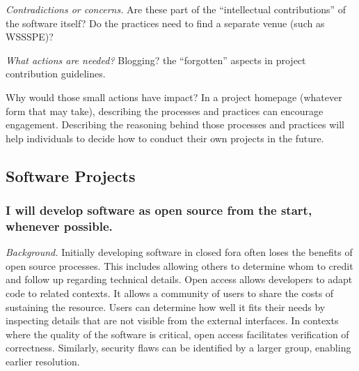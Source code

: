 \documentclass[a4paper,UKenglish]{dagman}
\renewcommand{\paragraph}[1]{\subsubsection*{#1}\xspace}
\begin{document}
\emph{Contradictions or concerns.} Are these part of the ``intellectual contributions'' of the software itself?  Do the practices need to find a separate venue (such as WSSSPE)?

\emph{What actions are needed?} Blogging?  the ``forgotten'' aspects in project contribution guidelines.

Why would those small actions have impact?
In a project homepage (whatever form that may take), describing the processes and practices can encourage engagement.  Describing the reasoning behind those processes and practices will help individuals to decide how to conduct their own projects in the future.  




\subsection{Software Projects}


\paragraph{I will develop software as open source from the start, whenever possible.}


\emph{Background.}
Initially developing software in closed fora often loses the benefits of open source processes. This includes allowing others to determine whom to credit and follow up regarding technical details. Open access allows developers to adapt code to related contexts. It allows a community of users to share the costs of sustaining the resource. Users can determine how well it fits their needs by inspecting details that are not visible from the external interfaces. In contexts where the quality of the software is critical, open access facilitates verification of correctness. Similarly, security flaws can be identified by a larger group, enabling earlier resolution.
 
\end{document}
